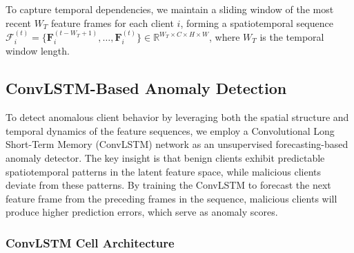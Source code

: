 To capture temporal dependencies, we maintain a sliding window of the most recent $W_T$ feature frames for each client $i$, forming a spatiotemporal sequence $\mathcal{F}_i^{(t)} = \{\mathbf{F}_i^{(t-W_T+1)}, \ldots, \mathbf{F}_i^{(t)}\} \in \mathbb{R}^{W_T \times C \times H \times W}$, where $W_T$ is the temporal window length.

\subsection{ConvLSTM-Based Anomaly Detection}\label{subsec:convlstm}

To detect anomalous client behavior by leveraging both the spatial structure and temporal dynamics of the feature sequences, we employ a Convolutional Long Short-Term Memory (ConvLSTM) network as an unsupervised forecasting-based anomaly detector. The key insight is that benign clients exhibit predictable spatiotemporal patterns in the latent feature space, while malicious clients deviate from these patterns. By training the ConvLSTM to forecast the next feature frame from the preceding frames in the sequence, malicious clients will produce higher prediction errors, which serve as anomaly scores.

\subsubsection{ConvLSTM Cell Architecture}

